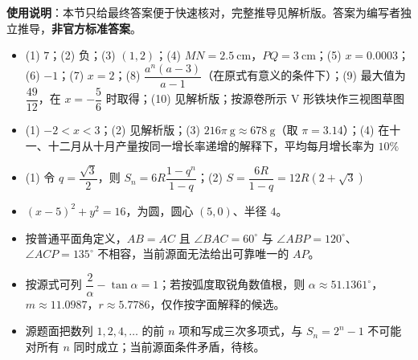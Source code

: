
\begin{gknotice}
\textbf{使用说明}：本节只给最终答案便于快速核对，完整推导见解析版。答案为编写者独立推导，\textbf{非官方标准答案}。
\end{gknotice}

\begin{itemize}[leftmargin=2.6em]
  \item[\textbf{1.}] (1) $7$；(2) 负；(3) $(1,2)$；(4) $MN=2.5\ \mathrm{cm}$，$PQ=3\ \mathrm{cm}$；(5) $x=0.0003$；(6) $-1$；(7) $x=2$；(8) $\dfrac{a^n(a-3)}{a-1}$（在原式有意义的条件下）；(9) 最大值为 $\dfrac{49}{12}$，在 $x=-\dfrac56$ 时取得；(10) 见解析版；按源卷所示 V 形铁块作三视图草图
  \item[\textbf{2.}] (1) $-2<x<3$；(2) 见解析版；(3) $216\pi\ \mathrm g\approx678\ \mathrm g$（取 $\pi=3.14$）；(4) 在十一、十二月从十月产量按同一增长率递增的解释下，平均每月增长率为 $10\%$
  \item[\textbf{3.}] (1) 令 $q=\dfrac{\sqrt3}{2}$，则 $S_n=6R\dfrac{1-q^n}{1-q}$；(2) $S=\dfrac{6R}{1-q}=12R(2+\sqrt3)$
  \item[\textbf{4.}] $(x-5)^2+y^2=16$，为圆，圆心 $(5,0)$、半径 $4$。
  \item[\textbf{5.}] 按普通平面角定义，$AB=AC$ 且 $\angle BAC=60^\circ$ 与 $\angle ABP=120^\circ$、$\angle ACP=135^\circ$ 不相容，当前源面无法给出可靠唯一的 $AP$。
  \item[\textbf{6.}] 按源式可列 $\dfrac2\alpha-\tan\alpha=1$；若按弧度取锐角数值根，则 $\alpha\approx51.1361^\circ$，$m\approx11.0987$，$r\approx5.7786$，仅作按字面解释的候选。
  \item[\textbf{7.}] 源题面把数列 $1,2,4,\ldots$ 的前 $n$ 项和写成三次多项式，与 $S_n=2^n-1$ 不可能对所有 $n$ 同时成立；当前源面条件矛盾，待核。
\end{itemize}

